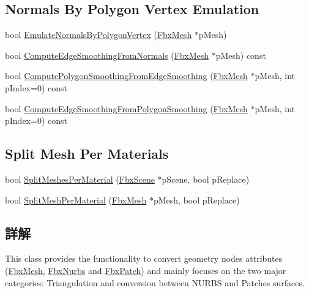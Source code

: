 \subsection*{Normals By Polygon Vertex Emulation}
\begin{DoxyCompactItemize}
\item 
bool \hyperlink{class_fbx_geometry_converter_a3c79ca6723b51b564842b9563f67102f}{Emulate\+Normals\+By\+Polygon\+Vertex} (\hyperlink{class_fbx_mesh}{Fbx\+Mesh} $\ast$p\+Mesh)
\item 
bool \hyperlink{class_fbx_geometry_converter_acf3f1e784136f58c62d8516777825bf7}{Compute\+Edge\+Smoothing\+From\+Normals} (\hyperlink{class_fbx_mesh}{Fbx\+Mesh} $\ast$p\+Mesh) const
\item 
bool \hyperlink{class_fbx_geometry_converter_a82e299d731d7e52443f7f0c7aaa61ce4}{Compute\+Polygon\+Smoothing\+From\+Edge\+Smoothing} (\hyperlink{class_fbx_mesh}{Fbx\+Mesh} $\ast$p\+Mesh, int p\+Index=0) const
\item 
bool \hyperlink{class_fbx_geometry_converter_a65bb00283eddbd2e2c34b723e134d147}{Compute\+Edge\+Smoothing\+From\+Polygon\+Smoothing} (\hyperlink{class_fbx_mesh}{Fbx\+Mesh} $\ast$p\+Mesh, int p\+Index=0) const
\end{DoxyCompactItemize}
\subsection*{Split Mesh Per Materials}
\begin{DoxyCompactItemize}
\item 
bool \hyperlink{class_fbx_geometry_converter_aed7a7dd03d949e08e008262fd5b57421}{Split\+Meshes\+Per\+Material} (\hyperlink{class_fbx_scene}{Fbx\+Scene} $\ast$p\+Scene, bool p\+Replace)
\item 
bool \hyperlink{class_fbx_geometry_converter_a3b48927a9d9394344598d1e9e80499bf}{Split\+Mesh\+Per\+Material} (\hyperlink{class_fbx_mesh}{Fbx\+Mesh} $\ast$p\+Mesh, bool p\+Replace)
\end{DoxyCompactItemize}


\subsection{詳解}
This class provides the functionality to convert geometry nodes attributes (\hyperlink{class_fbx_mesh}{Fbx\+Mesh}, \hyperlink{class_fbx_nurbs}{Fbx\+Nurbs} and \hyperlink{class_fbx_patch}{Fbx\+Patch}) and mainly focuses on the two major categories\+: Triangulation and conversion between N\+U\+R\+BS and Patches surfaces. 

